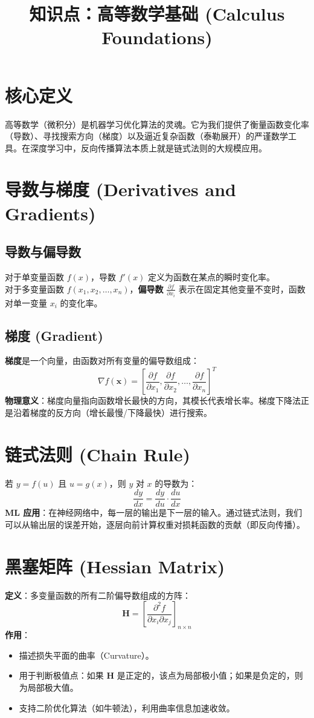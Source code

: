 \documentclass[12pt, a4paper]{article}
\title{知识点：高等数学基础 (Calculus Foundations)}
\author{}
\date{}
\begin{document}
\maketitle

\section{核心定义}
高等数学（微积分）是机器学习优化算法的灵魂。它为我们提供了衡量函数变化率（导数）、寻找搜索方向（梯度）以及逼近复杂函数（泰勒展开）的严谨数学工具。在深度学习中，反向传播算法本质上就是链式法则的大规模应用。

\section{导数与梯度 (Derivatives and Gradients)}

\subsection{导数与偏导数}
对于单变量函数 $f(x)$，导数 $f'(x)$ 定义为函数在某点的瞬时变化率。
\\ 对于多变量函数 $f(x_1, x_2, \dots, x_n)$，\textbf{偏导数} $\frac{\partial f}{\partial x_i}$ 表示在固定其他变量不变时，函数对单一变量 $x_i$ 的变化率。

\subsection{梯度 (Gradient)}
\textbf{梯度}是一个向量，由函数对所有变量的偏导数组成：
$$ \nabla f(\mathbf{x}) = \left[ \frac{\partial f}{\partial x_1}, \frac{\partial f}{\partial x_2}, \dots, \frac{\partial f}{\partial x_n} \right]^T $$
\textbf{物理意义}：梯度向量指向函数增长最快的方向，其模长代表增长率。梯度下降法正是沿着梯度的反方向（增长最慢/下降最快）进行搜索。

\section{链式法则 (Chain Rule)}
若 $y = f(u)$ 且 $u = g(x)$，则 $y$ 对 $x$ 的导数为：
$$ \frac{dy}{dx} = \frac{dy}{du} \cdot \frac{du}{dx} $$
\textbf{ML 应用}：在神经网络中，每一层的输出是下一层的输入。通过链式法则，我们可以从输出层的误差开始，逐层向前计算权重对损耗函数的贡献（即反向传播）。

\section{黑塞矩阵 (Hessian Matrix)}
\textbf{定义}：多变量函数的所有二阶偏导数组成的方阵：
$$ \mathbf{H} = \left[ \frac{\partial^2 f}{\partial x_i \partial x_j} \right]_{n \times n} $$
\textbf{作用}：
\begin{itemize}
    \item 描述损失平面的曲率（Curvature）。
    \item 用于判断极值点：如果 $\mathbf{H}$ 是正定的，该点为局部极小值；如果是负定的，则为局部极大值。
    \item 支持二阶优化算法（如牛顿法），利用曲率信息加速收敛。
\end{itemize}
\end{document}
